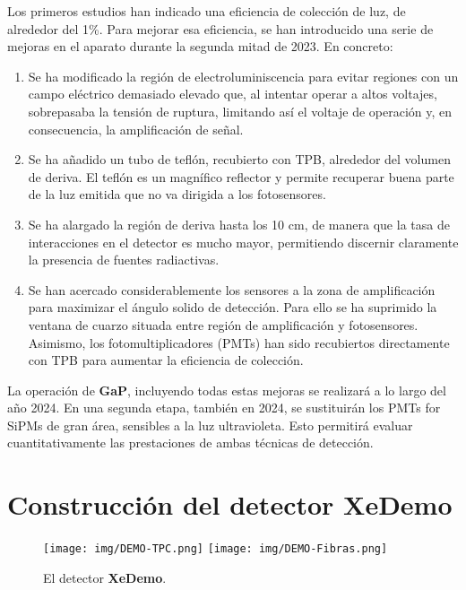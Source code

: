 \documentclass[12pt,a4paper,article]{report} %
\def\xed{{\bf XeDemo}}
\def\gap{{\bf GaP}}
\begin{document}
Los primeros estudios han indicado una eficiencia de colección de luz, de alrededor del 1\%. Para mejorar esa eficiencia, se han introducido una serie de mejoras en el aparato durante la segunda mitad de 2023. En concreto:
\begin{enumerate}
\item Se ha modificado la región de electroluminiscencia para evitar regiones con un campo eléctrico demasiado elevado que, al intentar operar a altos voltajes, sobrepasaba la tensión de ruptura, limitando así el voltaje de operación y, en consecuencia, la amplificación de señal.
\item Se ha añadido un tubo de teflón, recubierto con TPB, alrededor del volumen de deriva. El teflón es un magnífico reflector y permite recuperar buena parte de la luz emitida que no va dirigida a los fotosensores.
\item Se ha alargado la región de deriva hasta los 10 cm, de manera que la tasa de interacciones en el detector es mucho mayor, permitiendo discernir claramente la presencia de fuentes radiactivas.
\item Se han acercado considerablemente los sensores a la zona de amplificación para maximizar el ángulo solido de detección. Para ello se ha suprimido la ventana de cuarzo situada entre región de amplificación y fotosensores. Asimismo, los fotomultiplicadores (PMTs) han sido recubiertos directamente con TPB para aumentar la eficiencia de colección.
\end{enumerate}

La operación de \gap, incluyendo todas estas mejoras se realizará a lo largo
del año 2024. En una segunda etapa, también en 2024, se sustituirán los PMTs for SiPMs de gran área, sensibles a la luz ultravioleta. Esto permitirá evaluar cuantitativamente las prestaciones de ambas técnicas de detección. 



\section*{Construcción del detector \xed}

\begin{figure}[htbp]
\begin{center}
\texttt{[image: img/DEMO-TPC.png]}
\texttt{[image: img/DEMO-Fibras.png]}
\caption{El detector \xed.}
\label{fig:Xe-DEMO}
\end{center}
\end{figure}
\end{document}
